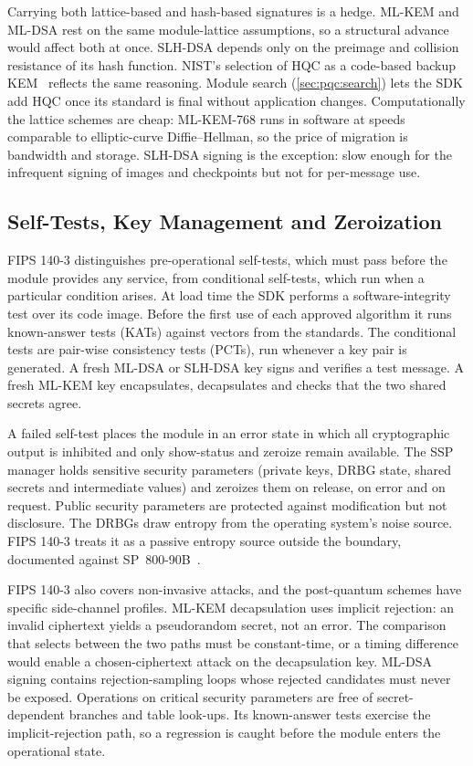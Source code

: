 Carrying both lattice-based and hash-based signatures is a hedge. ML-KEM and ML-DSA rest on the same module-lattice assumptions, so a structural advance would affect both at once. SLH-DSA depends only on the preimage and collision resistance of its hash function. NIST's selection of HQC as a code-based backup KEM~\cite{nist2025ir8545} reflects the same reasoning. Module search (\cref{sec:pqc:search}) lets the SDK add HQC once its standard is final without application changes. Computationally the lattice schemes are cheap: ML-KEM-768 runs in software at speeds comparable to elliptic-curve Diffie--Hellman, so the price of migration is bandwidth and storage. SLH-DSA signing is the exception: slow enough for the infrequent signing of images and checkpoints but not for per-message use.

\subsection{Self-Tests, Key Management and Zeroization}\label{sec:pqc:selftests}

FIPS 140-3 distinguishes pre-operational self-tests, which must pass before the module provides any service, from conditional self-tests, which run when a particular condition arises. At load time the SDK performs a software-integrity test over its code image. Before the first use of each approved algorithm it runs known-answer tests (KATs) against vectors from the standards. The conditional tests are pair-wise consistency tests (PCTs), run whenever a key pair is generated. A fresh ML-DSA or SLH-DSA key signs and verifies a test message. A fresh ML-KEM key encapsulates, decapsulates and checks that the two shared secrets agree.

A failed self-test places the module in an error state in which all cryptographic output is inhibited and only show-status and zeroize remain available. The SSP manager holds sensitive security parameters (private keys, DRBG state, shared secrets and intermediate values) and zeroizes them on release, on error and on request. Public security parameters are protected against modification but not disclosure. The DRBGs draw entropy from the operating system's noise source. FIPS 140-3 treats it as a passive entropy source outside the boundary, documented against SP~800-90B~\cite{nist2018sp80090b}.

FIPS 140-3 also covers non-invasive attacks, and the post-quantum schemes have specific side-channel profiles. ML-KEM decapsulation uses implicit rejection: an invalid ciphertext yields a pseudorandom secret, not an error. The comparison that selects between the two paths must be constant-time, or a timing difference would enable a chosen-ciphertext attack on the decapsulation key. ML-DSA signing contains rejection-sampling loops whose rejected candidates must never be exposed. Operations on critical security parameters are free of secret-dependent branches and table look-ups. Its known-answer tests exercise the implicit-rejection path, so a regression is caught before the module enters the operational state.

